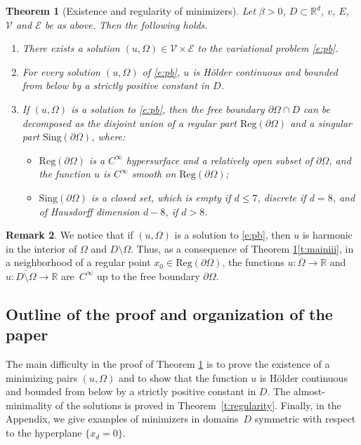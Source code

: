 \documentclass[JEP,XML,SOM,Unicode]{cedram}
\newenvironment{enumeratei}
{\bgroup\def\theenumi{\roman{enumi}}\def\theenumii{\arabic{enumii}}\begin{enumerate}}
{\end{enumerate}\egroup}
\newcommand{\Reg}{\mathrm{Reg}}
\newcommand{\Sing}{\mathrm{Sing}}
\theoremstyle{plain}
\newtheorem{teo}{Theorem}[section]
\theoremstyle{definition}
\newtheorem{oss}[teo]{Remark}
\def\R{\mathbb{R}}
\begin{document}
\begin{teo}[Existence and regularity of minimizers]\label{t:main}
Let $\beta\!>\!0$, $D\!\subset\!\R^d$, $v$, $E$,~$\mathcal V$ and $\mathcal E$ be as above. Then the following holds.

\begin{enumeratei}
\item\label{t:maini} There exists a solution $(u,\Omega)\in\mathcal V\times\mathcal E$ to the variational problem \eqref{e:pb}.
\item For every solution $(u,\Omega)$ of \eqref{e:pb}, $u$ is Hölder continuous and bounded from below by a strictly positive constant in $D$.

\item\label{t:mainii} If $(u,\Omega)$ is a solution to \eqref{e:pb}, then the free boundary $\partial\Omega\cap D$ can be decomposed as the disjoint union of a regular part $\Reg(\partial\Omega)$ and a singular part $\Sing(\partial\Omega)$, where:
\begin{itemize}
\item\label{t:mainiii} $\Reg(\partial\Omega)$ is a $C^{\infty}$ hypersurface and a relatively open subset of $\partial\Omega$, and the function $u$ is $C^\infty$ smooth on $\Reg(\partial\Omega)$;
\item $\Sing(\partial\Omega)$ is a closed set, which is empty if $d\le 7$, discrete if $d=8$, and of Hausdorff dimension $d-8$, if $d>8$.
\end{itemize}
\end{enumeratei}
\end{teo}

\begin{oss}
We notice that if $(u,\Omega)$ is a solution to \eqref{e:pb}, then $u$ is harmonic in the interior of $\Omega$ and $D\setminus\Omega$. Thus, as a consequence of Theorem \ref{t:main}\eqref{t:mainiii}, in a neighborhood of a regular point $x_0\in\Reg(\partial\Omega)$, the functions $u:\overline\Omega\to\R$ and $u:\overline{D\setminus\Omega}\to\R$ are~$C^\infty$ up to the free boundary $\partial\Omega$.
\end{oss}

\subsection{Outline of the proof and organization of the paper}\label{sub:sketch}
The main difficulty in the proof of Theorem \ref{t:main} is to prove the existence of a minimizing pairs $(u,\Omega)$ and to show that the function $u$ is Hölder continuous and bounded from below by a strictly positive constant in $D$. The almost-minimality of the solutions is proved in Theorem~\ref{t:regularity}. Finally, in the Appendix, we give examples of minimizers in domains~$D$ symmetric with respect to the hyperplane $\{x_d=0\}$.
\end{document}

